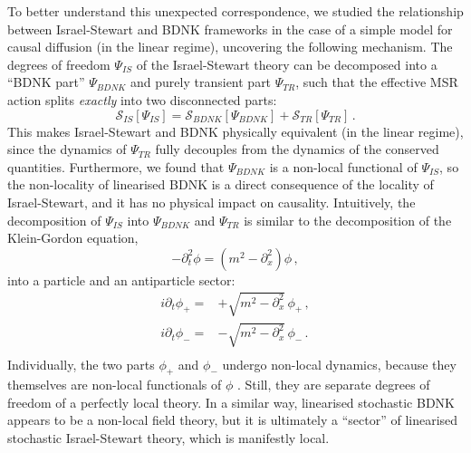 \documentclass[a4paper, amsfonts, amssymb, amsmath, reprint, showkeys, nofootinbib, twoside,notitlepage,onecolumn]{revtex4-2}
\theoremstyle{definition}
\begin{document}
To better understand this unexpected correspondence, we studied the relationship between Israel-Stewart and BDNK frameworks in the case of a simple model for causal diffusion (in the linear regime), uncovering the following mechanism. The degrees of freedom $\Psi_{IS}$ of the Israel-Stewart theory can be  decomposed into a ``BDNK part'' $\Psi_{BDNK}$ and purely transient part $\Psi_{TR}$, such that the effective MSR action splits \textit{exactly} into two disconnected parts:
\begin{equation}
    \mathcal{S}_{IS}[\Psi_{IS}]=\mathcal{S}_{BDNK}[\Psi_{BDNK}]+\mathcal{S}_{TR}[\Psi_{TR}] \, .
\end{equation}
This makes Israel-Stewart and BDNK physically equivalent (in the linear regime), since the dynamics of $\Psi_{TR}$ fully decouples from the dynamics of the conserved quantities. Furthermore, we found that $\Psi_{BDNK}$ is a non-local functional of $\Psi_{IS}$, so the non-locality of linearised BDNK is a direct consequence of the locality of Israel-Stewart, and it has no physical impact on causality. 
Intuitively, the decomposition of $\Psi_{IS}$ into $\Psi_{BDNK}$ and $\Psi_{TR}$ is similar to the decomposition of the Klein-Gordon equation,
\begin{equation}
    -\partial_t^2 \phi = (m^2-\partial^2_x)\phi \, ,
\end{equation}
into a particle and an antiparticle sector:
\begin{equation}
\begin{split}
i\partial_t \phi_+={}& +\sqrt{m^2-\partial^2_x} 
 \, \phi_+ \, ,\\
i\partial_t \phi_-={}& -\sqrt{m^2-\partial^2_x} \, \phi_- \, .\\
\end{split}
\end{equation}
Individually, the two parts $\phi_+$ and $\phi_-$ undergo non-local dynamics, because they themselves are non-local functionals of $\phi$ \cite{BaratLocalization2003,GavassinoDispersion2023}. Still, they are separate degrees of freedom of a perfectly local theory. In a similar way, linearised stochastic BDNK appears to be a non-local field theory, but it is ultimately a ``sector'' of linearised stochastic Israel-Stewart theory, which is manifestly local.


\end{document}
